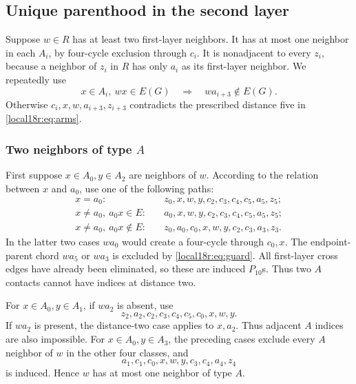\documentclass[11pt,a4paper]{article}
\theoremstyle{definition}\newtheorem{definition}[theorem]{Definition}
\theoremstyle{remark}\newtheorem{remark}[theorem]{Remark}
\begin{document}
\subsection{Unique parenthood in the second layer}
Suppose $w\in R$ has at least two first-layer neighbors. It has at most
one neighbor in each $A_i$, by four-cycle exclusion through $c_i$.
It is nonadjacent to every $z_i$, because a neighbor of $z_i$ in $R$
has only $a_i$ as its first-layer neighbor. We repeatedly use
\begin{equation}\label{local18r:eq:guard}
 x\in A_i,\ wx\in E(G)\quad\Longrightarrow\quad wa_{i+3}\notin E(G).
\end{equation}
Otherwise $c_i,x,w,a_{i+3},z_{i+3}$ contradicts the prescribed distance
five in \eqref{local18r:eq:arms}.

\subsubsection{Two neighbors of type $A$}
First suppose $x\in A_0,y\in A_2$ are neighbors of $w$. According to
the relation between $x$ and $a_0$, use one of the following paths:
\begin{align*}
 x=a_0:&\quad z_0,x,w,y,c_2,c_3,c_4,c_5,a_5,z_5;\\
 x\ne a_0,\ a_0x\in E:&\quad a_0,x,w,y,c_2,c_3,c_4,c_5,a_5,z_5;\\
 x\ne a_0,\ a_0x\notin E:&\quad
 z_0,a_0,c_0,x,w,y,c_2,c_3,a_3,z_3.
\end{align*}
In the latter two cases $wa_0$ would create a four-cycle through
$c_0,x$. The endpoint-parent chord $wa_5$ or $wa_3$ is excluded by
\eqref{local18r:eq:guard}. All first-layer cross edges have already been
eliminated, so these are induced $P_{10}$s. Thus two $A$ contacts cannot
have indices at distance two.

For $x\in A_0,y\in A_1$, if $wa_2$ is absent, use
\[
 z_2,a_2,c_2,c_3,c_4,c_5,c_0,x,w,y.
\]
If $wa_2$ is present, the distance-two case applies to $x,a_2$.
Thus adjacent $A$ indices are also impossible.
For $x\in A_0,y\in A_3$, the preceding cases exclude every $A$ neighbor
of $w$ in the other four classes, and
\[
 a_1,c_1,c_0,x,w,y,c_3,c_4,a_4,z_4
\]
is induced. Hence $w$ has at most one neighbor of type $A$.
\end{document}
